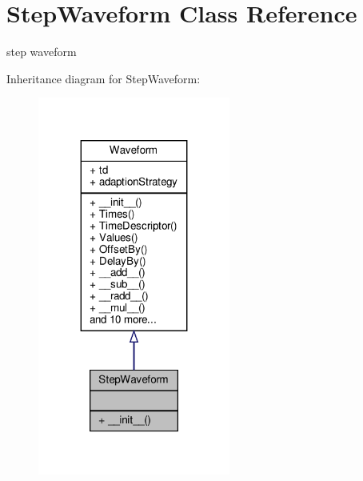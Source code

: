 \hypertarget{classSignalIntegrity_1_1TimeDomain_1_1Waveform_1_1StepWaveform_1_1StepWaveform}{}\section{Step\+Waveform Class Reference}
\label{classSignalIntegrity_1_1TimeDomain_1_1Waveform_1_1StepWaveform_1_1StepWaveform}


step waveform  




Inheritance diagram for Step\+Waveform\+:\nopagebreak
\begin{figure}[H]
\begin{center}
\leavevmode
\includegraphics[width=179pt]{classSignalIntegrity_1_1TimeDomain_1_1Waveform_1_1StepWaveform_1_1StepWaveform__inherit__graph}
\end{center}
\end{figure}


